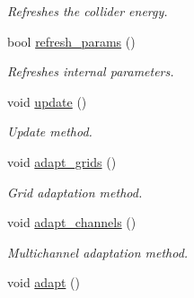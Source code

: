 \begin{DoxyCompactItemize}
\begin{DoxyCompactList}\small\item\em Refreshes the collider energy. \end{DoxyCompactList}\item 
\hypertarget{a00210_aa8ffb17e3fc087485af4e62493e299c1}{bool \hyperlink{a00210_aa8ffb17e3fc087485af4e62493e299c1}{refresh\-\_\-params} ()}\label{a00210_aa8ffb17e3fc087485af4e62493e299c1}

\begin{DoxyCompactList}\small\item\em Refreshes internal parameters. \end{DoxyCompactList}\item 
\hypertarget{a00210_a098839f6765c509366d5b4f4db22b762}{void \hyperlink{a00210_a098839f6765c509366d5b4f4db22b762}{update} ()}\label{a00210_a098839f6765c509366d5b4f4db22b762}

\begin{DoxyCompactList}\small\item\em Update method. \end{DoxyCompactList}\item 
\hypertarget{a00210_ab6f503920b9a99fc579cb868f2678127}{void \hyperlink{a00210_ab6f503920b9a99fc579cb868f2678127}{adapt\-\_\-grids} ()}\label{a00210_ab6f503920b9a99fc579cb868f2678127}

\begin{DoxyCompactList}\small\item\em Grid adaptation method. \end{DoxyCompactList}\item 
\hypertarget{a00210_af6256418b88f029197e80ff36c176c59}{void \hyperlink{a00210_af6256418b88f029197e80ff36c176c59}{adapt\-\_\-channels} ()}\label{a00210_af6256418b88f029197e80ff36c176c59}

\begin{DoxyCompactList}\small\item\em Multichannel adaptation method. \end{DoxyCompactList}\item 
\hypertarget{a00210_a47b3c2a1dd77d0f6537bf973e82ccab6}{void \hyperlink{a00210_a47b3c2a1dd77d0f6537bf973e82ccab6}{adapt} ()}\label{a00210_a47b3c2a1dd77d0f6537bf973e82ccab6}


\end{DoxyCompactItemize}
